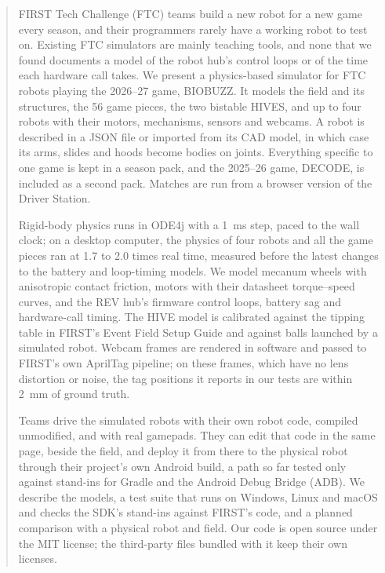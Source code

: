 \documentclass[10pt,twocolumn,letterpaper]{article}
\begin{document}
\makereporttitle

\begin{abstract}
FIRST Tech Challenge (FTC) teams build a new robot for a new game every season, and their programmers rarely have a working robot to test on. Existing FTC simulators are mainly teaching tools, and none that we found documents a model of the robot hub’s control loops or of the time each hardware call takes. We present a physics-based simulator for FTC robots playing the 2026–27 game, BIOBUZZ. It models the field and its structures, the 56 game pieces, the two bistable HIVES, and up to four robots with their motors, mechanisms, sensors and webcams. A robot is described in a JSON file or imported from its CAD model, in which case its arms, slides and hoods become bodies on joints. Everything specific to one game is kept in a season pack, and the 2025–26 game, DECODE, is included as a second pack. Matches are run from a browser version of the Driver Station.

Rigid-body physics runs in ODE4j with a 1~ms step, paced to the wall clock; on a desktop computer, the physics of four robots and all the game pieces ran at 1.7 to 2.0 times real time, measured before the latest changes to the battery and loop-timing models. We model mecanum wheels with anisotropic contact friction, motors with their datasheet torque–speed curves, and the REV hub's firmware control loops, battery sag and hardware-call timing. The HIVE model is calibrated against the tipping table in FIRST's Event Field Setup Guide and against balls launched by a simulated robot. Webcam frames are rendered in software and passed to FIRST's own AprilTag pipeline; on these frames, which have no lens distortion or noise, the tag positions it reports in our tests are within 2~mm of ground truth.

Teams drive the simulated robots with their own robot code, compiled unmodified, and with real gamepads. They can edit that code in the same page, beside the field, and deploy it from there to the physical robot through their project's own Android build, a path so far tested only against stand-ins for Gradle and the Android Debug Bridge (ADB). We describe the models, a test suite that runs on Windows, Linux and macOS and checks the SDK's stand-ins against FIRST's code, and a planned comparison with a physical robot and field. Our code is open source under the MIT license; the third-party files bundled with it keep their own licenses.
\end{abstract}
\end{document}
